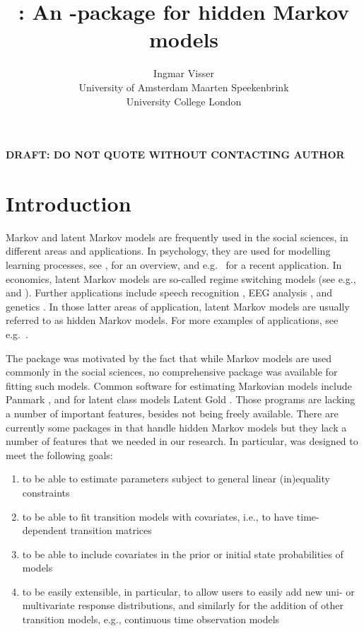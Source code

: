 \documentclass[article]{jss}
\author{Ingmar Visser\\University of Amsterdam \And 
        Maarten Speekenbrink\\University College London}
\title{\pkg{depmixS4} : An \proglang{R}-package for hidden Markov models}
\begin{document}


\begin{center}
\bf{DRAFT: DO NOT QUOTE WITHOUT CONTACTING AUTHOR}
\end{center}

\section{Introduction}

Markov and latent Markov models are frequently used in the social
sciences, in different areas and applications.  In psychology, they
are used for modelling learning processes, see \citet{Wickens1982},
for an overview, and e.g.\ \citet{Schmittmann2006} for a recent
application.  In economics, latent Markov models are so-called regime
switching models (see e.g., \citealp{Kim1994} and
\citealp{Ghysels1994}).  Further applications include speech
recognition \citep{Rabiner1989}, EEG analysis \citep{Rainer2000}, and
genetics \citep{Krogh1998}.  In those latter areas of application,
latent Markov models are usually referred to as hidden Markov models.
For more examples of applications, see e.g.\
\citet[][chapter~1]{Cappe2005}.

The  package was motivated by the fact that while Markov
models are used commonly in the social sciences, no comprehensive
package was available for fitting such models.  Common software for
estimating Markovian models include Panmark \citep{Pol1996}, and for
latent class models Latent Gold \citep{Vermunt2003}.  Those programs
are lacking a number of important features, besides not being freely
available.  There are currently some packages in \proglang{R} that
handle hidden Markov models but they lack a number of features that we
needed in our research.  In particular, \pkg{depmixS4} was designed to
meet the following goals:

\begin{enumerate}
	
	\item to be able to estimate parameters subject to general
	linear (in)equality constraints
	
	\item to be able to fit transition models with covariates, i.e.,
	to have time-dependent transition matrices
	
	\item to be able to include covariates in the prior or initial
	state probabilities of models
	
	\item to be easily extensible, in particular, to allow users to
	easily add new uni- or multivariate response distributions, and
	similarly for the addition of other transition models, e.g.,
	continuous time observation models
	
\end{enumerate}
\end{document}
